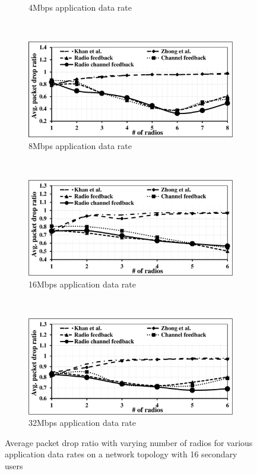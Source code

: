 \begin{landscape}
\begin{figure}[!htbp]
\begin{subfigure}[t]{0.625\textwidth}
        \caption{4Mbps application data rate}
    \end{subfigure}
    ~
    \begin{subfigure}[t]{0.625\textwidth}
        \includegraphics[width=\textwidth]{alltopology/12PacketDropRatio24d8}
        \caption{8Mbps application data rate}
    \end{subfigure}
    ~\\
    \begin{subfigure}[t]{0.625\textwidth}
        \includegraphics[width=\textwidth]{alltopology/16PacketDropRatio24d16}
        \caption{16Mbps application data rate}
    \end{subfigure}
    ~
    \begin{subfigure}[t]{0.625\textwidth}
        \includegraphics[width=\textwidth]{alltopology/12PacketDropRatio24d32}
        \caption{32Mbps application data rate}
    \end{subfigure}
    \caption{Average packet drop ratio with varying number of radios for various application data rates on a network topology with 16 secondary users}
\end{figure}
\end{landscape}

